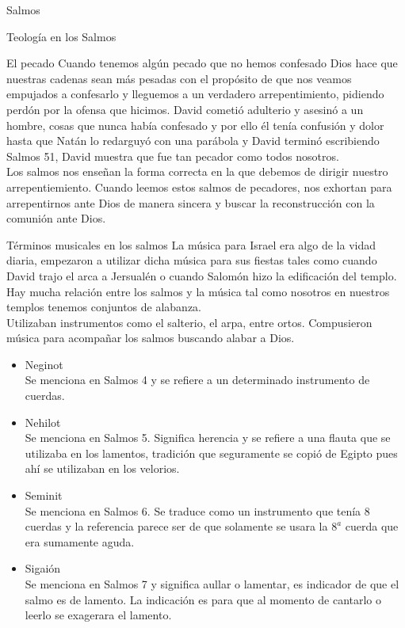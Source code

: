 \begin{section}{Salmos}
\begin{subsection}{Teología en los Salmos}
\begin{subsubsection}{El pecado}
			Cuando tenemos algún pecado que no hemos confesado Dios hace que nuestras cadenas sean más pesadas con el propósito de que nos veamos empujados a confesarlo y lleguemos a un verdadero arrepentimiento, pidiendo perdón por la ofensa que hicimos. David cometió adulterio y asesinó a un hombre, cosas que nunca había confesado y por ello él tenía confusión y dolor hasta que Natán lo redarguyó con una parábola y David terminó escribiendo Salmos 51, David muestra que fue tan pecador como todos nosotros.\\
			Los salmos nos enseñan la forma correcta en la que debemos de dirigir nuestro arrepentiemiento. Cuando leemos estos salmos de pecadores, nos exhortan para arrepentirnos ante Dios de manera sincera y buscar la reconstrucción con la comunión ante Dios.
		\end{subsubsection}
	\end{subsection}
	\begin{subsection}{Términos musicales en los salmos}
		La música para Israel era algo de la vidad diaria, empezaron a utilizar dicha música para sus fiestas tales como cuando David trajo el arca a Jersualén o cuando Salomón hizo la edificación del templo. Hay mucha relación entre los salmos y la música tal como nosotros en nuestros templos tenemos conjuntos de alabanza.\\
		Utilizaban instrumentos como el salterio, el arpa, entre ortos. Compusieron música para acompañar los salmos buscando alabar a Dios.
		\begin{itemize}
			\item Neginot\\
				Se menciona en Salmos 4 y se refiere a un determinado instrumento de cuerdas.
			\item Nehilot\\
				Se menciona en Salmos 5. Significa herencia y se refiere a una flauta que se utilizaba en los lamentos, tradición que seguramente se copió de Egipto pues ahí se utilizaban en los velorios.
				\newpage
			\item Seminit\\
				Se menciona en Salmos 6. Se traduce como un instrumento que tenía 8 cuerdas y la referencia parece ser de que solamente se usara la $8^{a}$ cuerda que era sumamente aguda.
			\item Sigaión\\
				Se menciona en Salmos 7 y significa aullar o lamentar, es indicador de que el salmo es de lamento. La indicación es para que al momento de cantarlo o leerlo se exagerara el lamento.

\end{itemize}
\end{subsection}
\end{section}
